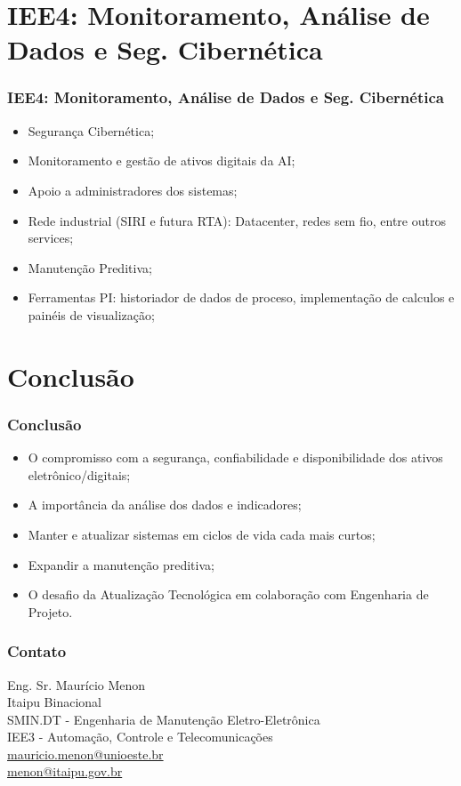 \documentclass{beamer}
\begin{document}
\section[IEE4]{IEE4: Monitoramento, Análise de Dados e Seg. Cibernética}
\begin{frame}
\frametitle{IEE4: Monitoramento, Análise de Dados e Seg. Cibernética}
\begin{itemize}
    \item Segurança Cibernética;
    \item Monitoramento e gestão de ativos digitais da AI;
    \item Apoio a administradores dos sistemas;
    \item Rede industrial (SIRI e futura RTA): Datacenter, redes sem fio, entre outros services;
    \item Manutenção Preditiva;
    \item Ferramentas PI: historiador de dados de proceso, implementação de calculos e painéis de visualização;
\end{itemize}
\end{frame}

\section[Conclusão]{Conclusão}
\begin{frame}
\frametitle{Conclusão}
\begin{itemize}
    \item O compromisso com a segurança, confiabilidade e disponibilidade dos ativos eletrônico/digitais;
    \item A importância da análise dos dados e indicadores;
    \item Manter e atualizar sistemas em ciclos de vida cada mais curtos;
    \item Expandir a manutenção preditiva;
    \item O desafio da Atualização Tecnológica em colaboração com Engenharia de Projeto.
\end{itemize}
\end{frame}

\begin{frame}
\frametitle{Contato}
\centering
Eng. Sr. Maurício Menon \\
Itaipu Binacional\\
SMIN.DT - Engenharia de Manutenção Eletro-Eletrônica\\
IEE3 - Automação, Controle e Telecomunicações\\
\href{mailto:mauricio.menon@unioeste.br}{mauricio.menon@unioeste.br} \\
\href{mailto:menon@itaipu.gov.br}{menon@itaipu.gov.br}
\end{frame}
\end{document}
